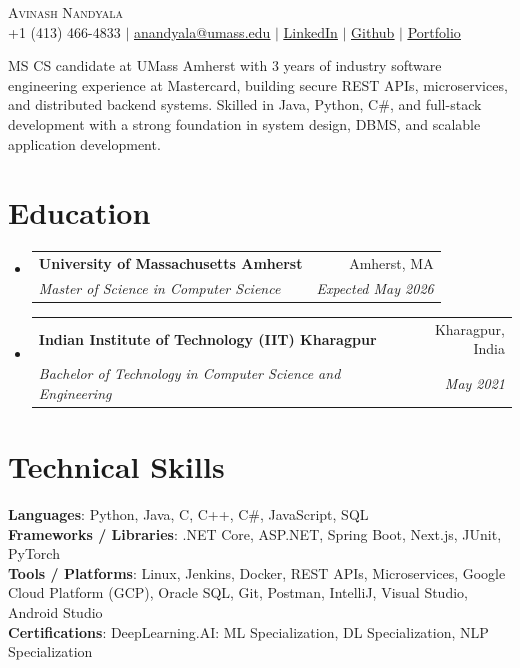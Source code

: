 \documentclass[letterpaper,10pt]{article}
\makeatletter
\newcommand{\resumeSubheading}[4]{
  \vspace{-2pt}\item
    \begin{tabular*}{0.97\textwidth}[t]{l@{\extracolsep{\fill}}r}
      \textbf{#1} & #2 \\
      \textit{\small#3} & \textit{\small #4} \\
    \end{tabular*}\vspace{-7pt}
}
\newcommand{\resumeSubHeadingListStart}{\begin{itemize}[leftmargin=0.15in, label={}]}
\newcommand{\resumeSubHeadingListEnd}{\end{itemize}}
\makeatother
\begin{document}

\begin{center}
  {\Huge\textsc{Avinash Nandyala}} \\ \vspace{1pt}
  \small +1 (413) 466-4833 $|$ \href{mailto:anandyala@umass.edu}{\underline{anandyala@umass.edu}} $|$
  \href{https://www.linkedin.com/in/avinash-nandyala-06a88b199/}{\underline{LinkedIn}} $|$
  \href{https://github.com/navinash47}{\underline{Github}} $|$
  \href{https://navinash47.github.io/Portfolio/}{\underline{Portfolio}}
\end{center}

\begin{center}
  \small{MS CS candidate at UMass Amherst with 3 years of industry software engineering experience at Mastercard, building secure REST APIs, microservices, and distributed backend systems. Skilled in Java, Python, C\#, and full-stack development with a strong foundation in system design, DBMS, and scalable application development.}
\end{center}

\section{Education}
\resumeSubHeadingListStart
  \resumeSubheading
    {University of Massachusetts Amherst}{Amherst, MA}
    {Master of Science in Computer Science}{Expected May 2026}
  \resumeSubheading
    {Indian Institute of Technology (IIT) Kharagpur}{Kharagpur, India}
    {Bachelor of Technology in Computer Science and Engineering}{May 2021}
\resumeSubHeadingListEnd

\section{Technical Skills}
\begin{itemize}[leftmargin=0.15in, label={}]
  \small{\item{
    \textbf{Languages}{: Python, Java, C, C++, C\#, JavaScript, SQL} \\
    \textbf{Frameworks / Libraries}{: .NET Core, ASP.NET, Spring Boot, Next.js, JUnit, PyTorch} \\
    \textbf{Tools / Platforms}{: Linux, Jenkins, Docker, REST APIs, Microservices, Google Cloud Platform (GCP), Oracle SQL, Git, Postman, IntelliJ, Visual Studio, Android Studio} \\
    \textbf{Certifications}{: DeepLearning.AI: ML Specialization, DL Specialization, NLP Specialization}
  }}
\end{itemize}
\end{document}
